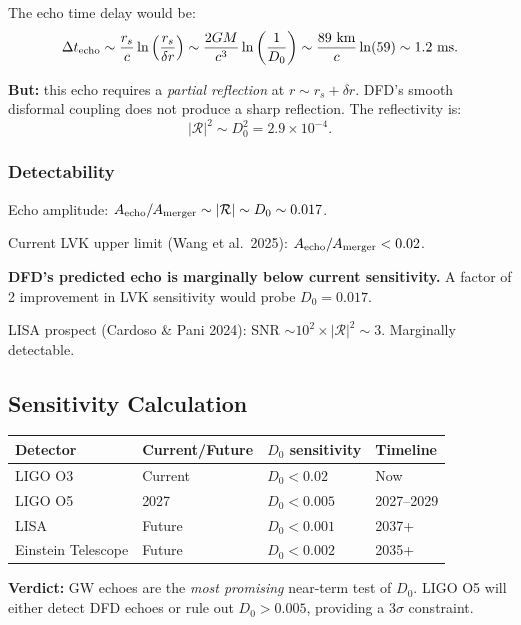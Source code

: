 \documentclass[11pt,a4paper]{article}
\begin{document}
The echo time delay would be:
\begin{equation}
\Delta t_{\rm echo} \sim \frac{r_s}{c}\ln\left(\frac{r_s}{\delta r}\right) \sim \frac{2GM}{c^3}\ln\left(\frac{1}{D_0}\right) \sim \frac{89\text{ km}}{c}\ln(59) \sim 1.2\text{ ms}.
\end{equation}

\textbf{But:} this echo requires a \emph{partial reflection} at $r \sim r_s + \delta r$. DFD's smooth disformal coupling does not produce a sharp reflection. The reflectivity is:
\begin{equation}
|\mathcal{R}|^2 \sim D_0^2 = 2.9 \times 10^{-4}.
\end{equation}

\subsubsection{Detectability}

Echo amplitude: $A_{\rm echo}/A_{\rm merger} \sim |\mathcal{R}| \sim D_0 \sim 0.017$.

Current LVK upper limit (Wang et al.\ 2025): $A_{\rm echo}/A_{\rm merger} < 0.02$.

\textbf{DFD's predicted echo is marginally below current sensitivity.} A factor of 2 improvement in LVK sensitivity would probe $D_0 = 0.017$.

LISA prospect (Cardoso \& Pani 2024): SNR $\sim 10^2 \times |\mathcal{R}|^2 \sim 3$. Marginally detectable.

\subsection{Sensitivity Calculation}

\begin{center}
\begin{tabular}{llll}
\toprule
\textbf{Detector} & \textbf{Current/Future} & \textbf{$D_0$ sensitivity} & \textbf{Timeline} \\
\midrule
LIGO O3 & Current & $D_0 < 0.02$ & Now \\
LIGO O5 & 2027 & $D_0 < 0.005$ & 2027--2029 \\
LISA & Future & $D_0 < 0.001$ & 2037+ \\
Einstein Telescope & Future & $D_0 < 0.002$ & 2035+ \\
\bottomrule
\end{tabular}
\end{center}

\textbf{Verdict:} GW echoes are the \emph{most promising} near-term test of $D_0$. LIGO O5 will either detect DFD echoes or rule out $D_0 > 0.005$, providing a 3$\sigma$ constraint.
\end{document}
